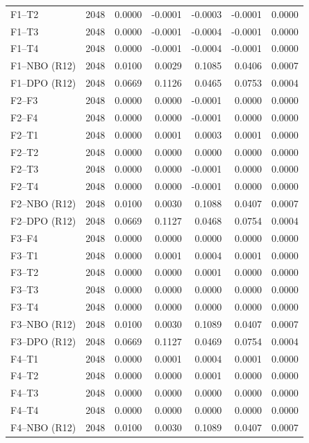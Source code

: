 \begin{longtable}{lrrrrrr}
F1--T2 & 2048 & 0.0000 & -0.0001 & -0.0003 & -0.0001 & 0.0000 \\
F1--T3 & 2048 & 0.0000 & -0.0001 & -0.0004 & -0.0001 & 0.0000 \\
F1--T4 & 2048 & 0.0000 & -0.0001 & -0.0004 & -0.0001 & 0.0000 \\
F1--NBO (R12) & 2048 & 0.0100 & 0.0029 & 0.1085 & 0.0406 & 0.0007 \\
F1--DPO (R12) & 2048 & 0.0669 & 0.1126 & 0.0465 & 0.0753 & 0.0004 \\
F2--F3 & 2048 & 0.0000 & 0.0000 & -0.0001 & 0.0000 & 0.0000 \\
F2--F4 & 2048 & 0.0000 & 0.0000 & -0.0001 & 0.0000 & 0.0000 \\
F2--T1 & 2048 & 0.0000 & 0.0001 & 0.0003 & 0.0001 & 0.0000 \\
F2--T2 & 2048 & 0.0000 & 0.0000 & 0.0000 & 0.0000 & 0.0000 \\
F2--T3 & 2048 & 0.0000 & 0.0000 & -0.0001 & 0.0000 & 0.0000 \\
F2--T4 & 2048 & 0.0000 & 0.0000 & -0.0001 & 0.0000 & 0.0000 \\
F2--NBO (R12) & 2048 & 0.0100 & 0.0030 & 0.1088 & 0.0407 & 0.0007 \\
F2--DPO (R12) & 2048 & 0.0669 & 0.1127 & 0.0468 & 0.0754 & 0.0004 \\
F3--F4 & 2048 & 0.0000 & 0.0000 & 0.0000 & 0.0000 & 0.0000 \\
F3--T1 & 2048 & 0.0000 & 0.0001 & 0.0004 & 0.0001 & 0.0000 \\
F3--T2 & 2048 & 0.0000 & 0.0000 & 0.0001 & 0.0000 & 0.0000 \\
F3--T3 & 2048 & 0.0000 & 0.0000 & 0.0000 & 0.0000 & 0.0000 \\
F3--T4 & 2048 & 0.0000 & 0.0000 & 0.0000 & 0.0000 & 0.0000 \\
F3--NBO (R12) & 2048 & 0.0100 & 0.0030 & 0.1089 & 0.0407 & 0.0007 \\
F3--DPO (R12) & 2048 & 0.0669 & 0.1127 & 0.0469 & 0.0754 & 0.0004 \\
F4--T1 & 2048 & 0.0000 & 0.0001 & 0.0004 & 0.0001 & 0.0000 \\
F4--T2 & 2048 & 0.0000 & 0.0000 & 0.0001 & 0.0000 & 0.0000 \\
F4--T3 & 2048 & 0.0000 & 0.0000 & 0.0000 & 0.0000 & 0.0000 \\
F4--T4 & 2048 & 0.0000 & 0.0000 & 0.0000 & 0.0000 & 0.0000 \\
F4--NBO (R12) & 2048 & 0.0100 & 0.0030 & 0.1089 & 0.0407 & 0.0007 \\

\end{longtable}
